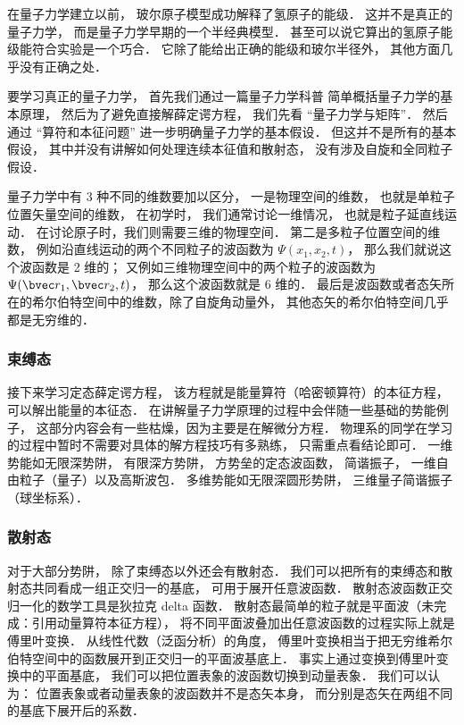 在量子力学建立以前， 玻尔原子模型成功解释了氢原子的能级． 这并不是真正的量子力学， 而是量子力学早期的一个半经典模型． 甚至可以说它算出的氢原子能级能符合实验是一个巧合． 它除了能给出正确的能级和玻尔半径外， 其他方面几乎没有正确之处．

要学习真正的量子力学， 首先我们通过一篇量子力学科普 简单概括量子力学的基本原理， 然后为了避免直接解薛定谔方程， 我们先看 “量子力学与矩阵”． 然后通过 “算符和本征问题” 进一步明确量子力学的基本假设． 但这并不是所有的基本假设， 其中并没有讲解如何处理连续本征值和散射态， 没有涉及自旋和全同粒子假设．

量子力学中有 3 种不同的维数要加以区分， 一是物理空间的维数， 也就是单粒子位置矢量空间的维数， 在初学时， 我们通常讨论一维情况， 也就是粒子延直线运动． 在讨论原子时，我们则需要三维的物理空间． 第二是多粒子位置空间的维数， 例如沿直线运动的两个不同粒子的波函数为 $\Psi(x_1,x_2,t)$， 那么我们就说这个波函数是 2 维的； 又例如三维物理空间中的两个粒子的波函数为 $\Psi(\bvec r_1, \bvec r_2, t)$， 那么这个波函数就是 6 维的． 最后是波函数或者态矢所在的希尔伯特空间中的维数，除了自旋角动量外， 其他态矢的希尔伯特空间几乎都是无穷维的．

\subsubsection{束缚态}
接下来学习定态薛定谔方程， 该方程就是能量算符（哈密顿算符）的本征方程， 可以解出能量的本征态． 在讲解量子力学原理的过程中会伴随一些基础的势能例子， 这部分内容会有一些枯燥，因为主要是在解微分方程． 物理系的同学在学习的过程中暂时不需要对具体的解方程技巧有多熟练， 只需重点看结论即可． 一维势能如无限深势阱， 有限深方势阱， 方势垒的定态波函数， 简谐振子， 一维自由粒子（量子）以及高斯波包． 多维势能如无限深圆形势阱， 三维量子简谐振子（球坐标系）．

\subsubsection{散射态}
对于大部分势阱， 除了束缚态以外还会有散射态． 我们可以把所有的束缚态和散射态共同看成一组正交归一的基底， 可用于展开任意波函数． 散射态波函数正交归一化的数学工具是狄拉克 delta 函数． 散射态最简单的粒子就是平面波（未完成：引用动量算符本征方程）， 将不同平面波叠加出任意波函数的过程实际上就是傅里叶变换． 从线性代数（泛函分析）的角度， 傅里叶变换相当于把无穷维希尔伯特空间中的函数展开到正交归一的平面波基底上． 事实上通过变换到傅里叶变换中的平面基底， 我们可以把位置表象的波函数切换到动量表象． 我们可以认为： 位置表象或者动量表象的波函数并不是态矢本身， 而分别是态矢在两组不同的基底下展开后的系数．

